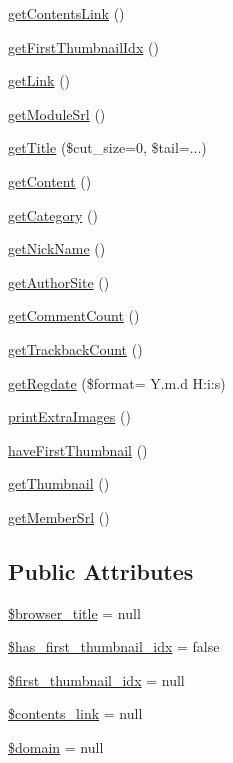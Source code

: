 \begin{DoxyCompactItemize}
\hyperlink{classmcontentItem_a60fe1f5cbd47314c2910a8782a3252a9}{get\+Contents\+Link} ()
\item 
\hyperlink{classmcontentItem_acb7e5ab4fbeac716585618eba64960aa}{get\+First\+Thumbnail\+Idx} ()
\item 
\hyperlink{classmcontentItem_a5a2cad58644aabb016942e427998f32c}{get\+Link} ()
\item 
\hyperlink{classmcontentItem_a9b9841e39ff3ee331679270f9e075203}{get\+Module\+Srl} ()
\item 
\hyperlink{classmcontentItem_a180633138fb77537e7da900074aa7454}{get\+Title} (\$cut\+\_\+size=0, \$tail=\textquotesingle{}...\textquotesingle{})
\item 
\hyperlink{classmcontentItem_a19b333e6ff14db6f7f77c3f94471bdff}{get\+Content} ()
\item 
\hyperlink{classmcontentItem_ae8d1d6e76cc1cfa79d544d47acaedbcc}{get\+Category} ()
\item 
\hyperlink{classmcontentItem_a8182db3f99934760d5f52082b233a1cb}{get\+Nick\+Name} ()
\item 
\hyperlink{classmcontentItem_a90fc323e4d3cf2661e6af5e51babd05f}{get\+Author\+Site} ()
\item 
\hyperlink{classmcontentItem_ac60221ec5be0a8158c5248c09efd8fb1}{get\+Comment\+Count} ()
\item 
\hyperlink{classmcontentItem_afb955c421fa34f36c51edd795d3a00c7}{get\+Trackback\+Count} ()
\item 
\hyperlink{classmcontentItem_a9f7a6c2fc454c1d7e7524504141f3fc1}{get\+Regdate} (\$format= \textquotesingle{}Y.\+m.\+d H\+:i\+:s\textquotesingle{})
\item 
\hyperlink{classmcontentItem_a0cd7ac4bbaf7e7561f5597920c691f9d}{print\+Extra\+Images} ()
\item 
\hyperlink{classmcontentItem_ac8b5fb3d84cdc8a96a8c02e9472e25dd}{have\+First\+Thumbnail} ()
\item 
\hyperlink{classmcontentItem_a25e5c63dceabc33afe0b5ce5b3ddafcf}{get\+Thumbnail} ()
\item 
\hyperlink{classmcontentItem_ab7ad6741a93ab7d631f78bf1253f6800}{get\+Member\+Srl} ()
\end{DoxyCompactItemize}
\subsection*{Public Attributes}
\begin{DoxyCompactItemize}
\item 
\hyperlink{classmcontentItem_afdef241bedb2d1829475b7bb623cecf7}{\$browser\+\_\+title} = null
\item 
\hyperlink{classmcontentItem_a8c95afa6c7bcad64626c9f343e77cdd4}{\$has\+\_\+first\+\_\+thumbnail\+\_\+idx} = false
\item 
\hyperlink{classmcontentItem_a358e826e3ee863300d43b12a8218a5fa}{\$first\+\_\+thumbnail\+\_\+idx} = null
\item 
\hyperlink{classmcontentItem_afdee32faf59897fa7e02f9ed4389b411}{\$contents\+\_\+link} = null
\item 
\hyperlink{classmcontentItem_ad92b662d98d23cb2a10747de7ffdada0}{\$domain} = null
\end{DoxyCompactItemize}



